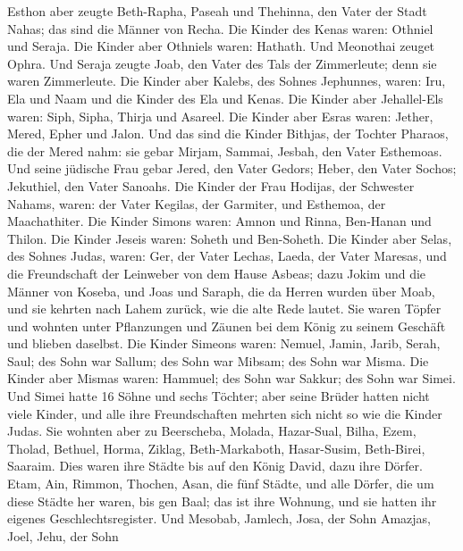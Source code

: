  Esthon aber zeugte Beth-Rapha, Paseah und Thehinna, den
Vater der Stadt Nahas; das sind die Männer von Recha. 
Die Kinder des Kenas waren: Othniel und Seraja. Die Kinder aber Othniels
waren: Hathath.  Und Meonothai zeuget Ophra. Und Seraja
zeugte Joab, den Vater des Tals der Zimmerleute; denn sie waren
Zimmerleute.  Die Kinder aber Kalebs, des Sohnes
Jephunnes, waren: Iru, Ela und Naam und die Kinder des Ela und Kenas.
 Die Kinder aber Jehallel-Els waren: Siph, Sipha, Thirja
und Asareel.  Die Kinder aber Esras waren: Jether, Mered,
Epher und Jalon. Und das sind die Kinder Bithjas, der Tochter Pharaos,
die der Mered nahm: sie gebar Mirjam, Sammai, Jesbah, den Vater
Esthemoas.  Und seine jüdische Frau gebar Jered, den
Vater Gedors; Heber, den Vater Sochos; Jekuthiel, den Vater Sanoahs.
 Die Kinder der Frau Hodijas, der Schwester Nahams,
waren: der Vater Kegilas, der Garmiter, und Esthemoa, der Maachathiter.
 Die Kinder Simons waren: Amnon und Rinna, Ben-Hanan und
Thilon. Die Kinder Jeseis waren: Soheth und Ben-Soheth. 
Die Kinder aber Selas, des Sohnes Judas, waren: Ger, der Vater Lechas,
Laeda, der Vater Maresas, und die Freundschaft der Leinweber von dem
Hause Asbeas;  dazu Jokim und die Männer von Koseba, und
Joas und Saraph, die da Herren wurden über Moab, und sie kehrten nach
Lahem zurück, wie die alte Rede lautet.  Sie waren Töpfer
und wohnten unter Pflanzungen und Zäunen bei dem König zu seinem
Geschäft und blieben daselbst.  Die Kinder Simeons waren:
Nemuel, Jamin, Jarib, Serah, Saul;  des Sohn war Sallum;
des Sohn war Mibsam; des Sohn war Misma.  Die Kinder aber
Mismas waren: Hammuel; des Sohn war Sakkur; des Sohn war Simei.
 Und Simei hatte 16 Söhne und sechs Töchter; aber seine
Brüder hatten nicht viele Kinder, und alle ihre Freundschaften mehrten
sich nicht so wie die Kinder Judas.  Sie wohnten aber zu
Beerscheba, Molada, Hazar-Sual,  Bilha, Ezem, Tholad,
 Bethuel, Horma, Ziklag,  Beth-Markaboth,
Hasar-Susim, Beth-Birei, Saaraim. Dies waren ihre Städte bis auf den
König David, dazu ihre Dörfer.  Etam, Ain, Rimmon,
Thochen, Asan, die fünf Städte,  und alle Dörfer, die um
diese Städte her waren, bis gen Baal; das ist ihre Wohnung, und sie
hatten ihr eigenes Geschlechtsregister.  Und Mesobab,
Jamlech, Josa, der Sohn Amazjas,  Joel, Jehu, der Sohn
